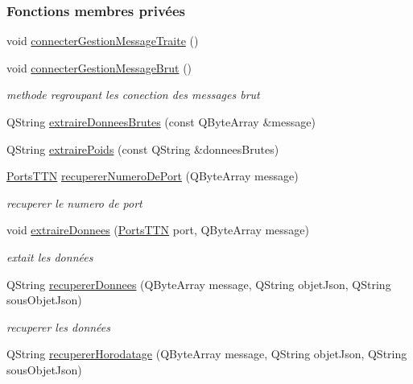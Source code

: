 \subsubsection*{Fonctions membres privées}
\begin{DoxyCompactItemize}
\item 
void \hyperlink{class_ruche_a20ec8c6dc931218e5cf682050fe845d9}{connecter\+Gestion\+Message\+Traite} ()
\item 
void \hyperlink{class_ruche_a9c8e7e3b529676c6dda3d936370af00f}{connecter\+Gestion\+Message\+Brut} ()
\begin{DoxyCompactList}\small\item\em methode regroupant les conection des messages brut \end{DoxyCompactList}\item 
Q\+String \hyperlink{class_ruche_a97d167a57144e9d923007b732d4e6091}{extraire\+Donnees\+Brutes} (const Q\+Byte\+Array \&message)
\item 
Q\+String \hyperlink{class_ruche_a309bff2fac1f8562da0f5f1a5d75c907}{extraire\+Poids} (const Q\+String \&donnees\+Brutes)
\item 
\hyperlink{parametres_8h_a0fe68caa1e9147addc96657cc822b937}{Ports\+T\+TN} \hyperlink{class_ruche_a157782119650e2bd196612c3fa66972c}{recuperer\+Numero\+De\+Port} (Q\+Byte\+Array message)
\begin{DoxyCompactList}\small\item\em recuperer le numero de port \end{DoxyCompactList}\item 
void \hyperlink{class_ruche_a21c0dafeaec03d451590037343e6a3ca}{extraire\+Donnees} (\hyperlink{parametres_8h_a0fe68caa1e9147addc96657cc822b937}{Ports\+T\+TN} port, Q\+Byte\+Array message)
\begin{DoxyCompactList}\small\item\em extait les données \end{DoxyCompactList}\item 
Q\+String \hyperlink{class_ruche_a68e487fc714c68b7d4f761cad9122b39}{recuperer\+Donnees} (Q\+Byte\+Array message, Q\+String objet\+Json, Q\+String sous\+Objet\+Json)
\begin{DoxyCompactList}\small\item\em recuperer les données \end{DoxyCompactList}\item 
Q\+String \hyperlink{class_ruche_a072193021274bb4308776934c35f7443}{recuperer\+Horodatage} (Q\+Byte\+Array message, Q\+String objet\+Json, Q\+String sous\+Objet\+Json)

\end{DoxyCompactItemize}
